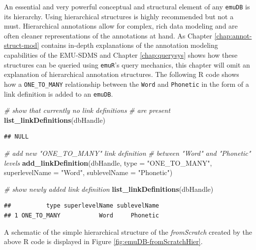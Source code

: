 \documentclass[]{book}
\newenvironment{Shaded}{\begin{snugshade}}{\end{snugshade}}
\newcommand{\CommentTok}[1]{\textcolor[rgb]{0.56,0.35,0.01}{\textit{#1}}}
\newcommand{\DataTypeTok}[1]{\textcolor[rgb]{0.13,0.29,0.53}{#1}}
\newcommand{\KeywordTok}[1]{\textcolor[rgb]{0.13,0.29,0.53}{\textbf{#1}}}
\newcommand{\NormalTok}[1]{#1}
\newcommand{\StringTok}[1]{\textcolor[rgb]{0.31,0.60,0.02}{#1}}
\begin{document}
An essential and very powerful conceptual and structural element of any \texttt{emuDB} is its hierarchy. Using hierarchical structures is highly recommended but not a must. Hierarchical annotations allow for complex, rich data modeling and are often cleaner representations of the annotations at hand. As Chapter \ref{chap:annot-struct-mod} contains in-depth explanations of the annotation modeling capabilities of the EMU-SDMS and Chapter \ref{chap:querysys} shows how these structures can be queried using \texttt{emuR}'s query mechanics, this chapter will omit an explanation of hierarchical annotation structures. The following R code shows how a \texttt{ONE\_TO\_MANY} relationship between the \texttt{Word} and \texttt{Phonetic} in the form of a link definition is added to an \texttt{emuDB}.

\begin{Shaded}
\begin{Highlighting}[]
\CommentTok{# show that currently no link definitions}
\CommentTok{# are present}
\KeywordTok{list_linkDefinitions}\NormalTok{(dbHandle)}
\end{Highlighting}
\end{Shaded}

\begin{verbatim}
## NULL
\end{verbatim}

\begin{Shaded}
\begin{Highlighting}[]
\CommentTok{# add new "ONE_TO_MANY" link definition}
\CommentTok{# between "Word" and "Phonetic" levels}
\KeywordTok{add_linkDefinition}\NormalTok{(dbHandle,}
                   \DataTypeTok{type =} \StringTok{"ONE_TO_MANY"}\NormalTok{,}
                   \DataTypeTok{superlevelName =} \StringTok{"Word"}\NormalTok{,}
                   \DataTypeTok{sublevelName =} \StringTok{"Phonetic"}\NormalTok{)}

\CommentTok{# show newly added link definition}
\KeywordTok{list_linkDefinitions}\NormalTok{(dbHandle)}
\end{Highlighting}
\end{Shaded}

\begin{verbatim}
##          type superlevelName sublevelName
## 1 ONE_TO_MANY           Word     Phonetic
\end{verbatim}

A schematic of the simple hierarchical structure of the \emph{fromScratch} created by the above R code is displayed in Figure \ref{fig:emuDB-fromScratchHier}.
\end{document}
